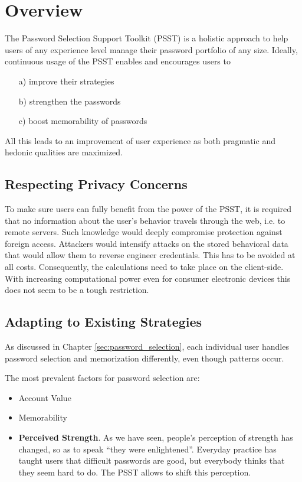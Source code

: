 
\chapter[Overview]{Overview}\label{chap:psst_overview}

The Password Selection Support Toolkit (PSST) is a holistic approach to help users of any experience level manage their password portfolio of any size. Ideally, continuous usage of the PSST enables and encourages users to 
\begin{enumerate}
\item[a)] improve their strategies
\item[b)] strengthen the passwords
\item[c)] boost memorability of passwords
\end{enumerate}
All this leads to an improvement of user experience as both pragmatic and hedonic qualities are maximized. 

\section{Respecting Privacy Concerns}
To make sure users can fully benefit from the power of the PSST, it is required that no information about the user's behavior travels through the web, i.e. to remote servers. Such knowledge would deeply compromise protection against foreign access. Attackers would intensify attacks on the stored behavioral data that would allow them to reverse engineer credentials. This has to be avoided at all costs. Consequently, the calculations need to take place on the client-side. With increasing computational power even for consumer electronic devices this does not seem to be a tough restriction. 

\section{Adapting to Existing Strategies}
As discussed in Chapter \ref{sec:password_selection}, each individual user handles password selection and memorization differently, even though patterns occur. 

The most prevalent factors for password selection are:
\begin{itemize}
\item Account Value
\item Memorability
\item \textbf{Perceived Strength}. As we have seen, people's perception of strength has changed, so as to speak ``they were enlightened''. Everyday practice has taught users that difficult passwords are good, but everybody thinks that they seem hard to do. The PSST allows to shift this perception. 
\end{itemize}

